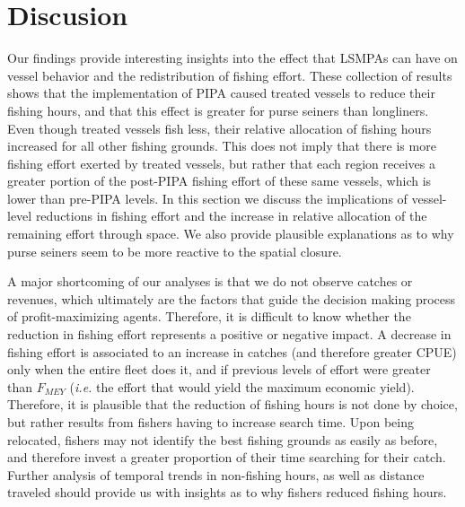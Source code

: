 \documentclass[12pt,]{article}
\begin{document}
\clearpage

\section{Discusion}\label{discusion}

Our findings provide interesting insights into the effect that LSMPAs
can have on vessel behavior and the redistribution of fishing effort.
These collection of results shows that the implementation of PIPA caused
treated vessels to reduce their fishing hours, and that this effect is
greater for purse seiners than longliners. Even though treated vessels
fish less, their relative allocation of fishing hours increased for all
other fishing grounds. This does not imply that there is more fishing
effort exerted by treated vessels, but rather that each region receives
a greater portion of the post-PIPA fishing effort of these same vessels,
which is lower than pre-PIPA levels. In this section we discuss the
implications of vessel-level reductions in fishing effort and the
increase in relative allocation of the remaining effort through space.
We also provide plausible explanations as to why purse seiners seem to
be more reactive to the spatial closure.

A major shortcoming of our analyses is that we do not observe catches or
revenues, which ultimately are the factors that guide the decision
making process of profit-maximizing agents. Therefore, it is difficult
to know whether the reduction in fishing effort represents a positive or
negative impact. A decrease in fishing effort is associated to an
increase in catches (and therefore greater CPUE) only when the entire
fleet does it, and if previous levels of effort were greater than
\(F_{MEY}\) (\emph{i.e.} the effort that would yield the maximum
economic yield). Therefore, it is plausible that the reduction of
fishing hours is not done by choice, but rather results from fishers
having to increase search time. Upon being relocated, fishers may not
identify the best fishing grounds as easily as before, and therefore
invest a greater proportion of their time searching for their catch.
Further analysis of temporal trends in non-fishing hours, as well as
distance traveled should provide us with insights as to why fishers
reduced fishing hours.
\end{document}
